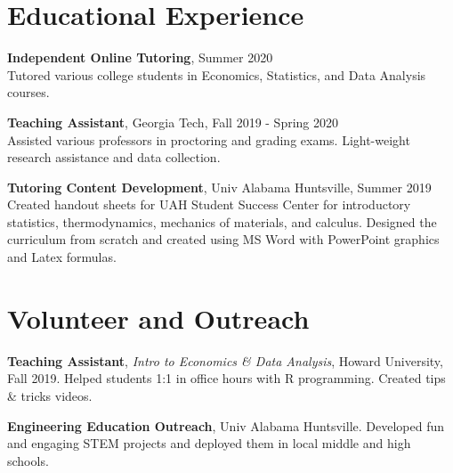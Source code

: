 \documentclass[margin,line]{res}
\begin{document}
\begin{resume}
\vspace{.75cm}
 \section{\sc Educational Experience}
 

    {\bf Independent Online Tutoring}, Summer 2020\\
    {Tutored various college students in Economics, Statistics, and Data Analysis courses.}

    {\bf Teaching Assistant}, Georgia Tech, Fall 2019 - Spring 2020\\
    {Assisted various professors in proctoring and grading exams. Light-weight research assistance and data collection.}
    
    {\bf Tutoring Content Development}, Univ Alabama Huntsville, Summer 2019\\
    {Created handout sheets for UAH Student Success Center for introductory statistics, thermodynamics, mechanics of materials, and calculus. Designed the curriculum from scratch and created using MS Word with PowerPoint graphics and Latex formulas.}

\vspace{.75cm}
\section{\sc Volunteer and Outreach}

{\bf Teaching Assistant}, {\it Intro to Economics \& Data Analysis}, Howard University, Fall 2019.
{Helped students 1:1 in office hours with R programming. Created tips \& tricks videos.}

{\bf Engineering Education Outreach}, Univ Alabama Huntsville.
{Developed fun and engaging STEM projects and deployed them in local middle and high schools.}


\end{resume}
\end{document}
